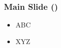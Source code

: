 \documentclass{beamer}
\def\insertcont{%
  \pgfmathparse{\insertpagenumber-\insertframestartpage+1}%
  (\pgfmathprintnumber{\pgfmathresult})%
}
\begin{document}
    \begin{frame}
        \frametitle{Main Slide \insertcont}
        \begin{itemize} 
            \item ABC 
            \item XYZ 
        \end{itemize}
    \end{frame}
\end{document}
